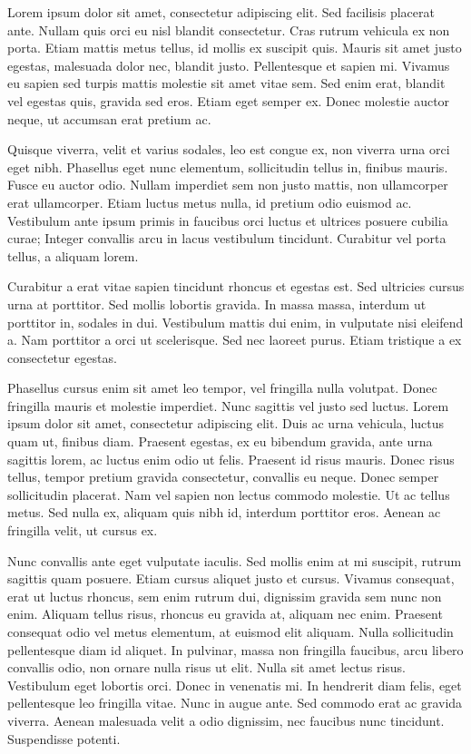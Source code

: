 \documentclass{article}
\begin{document}
Lorem ipsum dolor sit amet, consectetur adipiscing elit. Sed facilisis placerat ante. Nullam quis orci eu nisl blandit consectetur. Cras rutrum vehicula ex non porta. Etiam mattis metus tellus, id mollis ex suscipit quis. Mauris sit amet justo egestas, malesuada dolor nec, blandit justo. Pellentesque et sapien mi. Vivamus eu sapien sed turpis mattis molestie sit amet vitae sem. Sed enim erat, blandit vel egestas quis, gravida sed eros. Etiam eget semper ex. Donec molestie auctor neque, ut accumsan erat pretium ac.

Quisque viverra, velit et varius sodales, leo est congue ex, non viverra urna orci eget nibh. Phasellus eget nunc elementum, sollicitudin tellus in, finibus mauris. Fusce eu auctor odio. Nullam imperdiet sem non justo mattis, non ullamcorper erat ullamcorper. Etiam luctus metus nulla, id pretium odio euismod ac. Vestibulum ante ipsum primis in faucibus orci luctus et ultrices posuere cubilia curae; Integer convallis arcu in lacus vestibulum tincidunt. Curabitur vel porta tellus, a aliquam lorem.

Curabitur a erat vitae sapien tincidunt rhoncus et egestas est. Sed ultricies cursus urna at porttitor. Sed mollis lobortis gravida. In massa massa, interdum ut porttitor in, sodales in dui. Vestibulum mattis dui enim, in vulputate nisi eleifend a. Nam porttitor a orci ut scelerisque. Sed nec laoreet purus. Etiam tristique a ex consectetur egestas.

Phasellus cursus enim sit amet leo tempor, vel fringilla nulla volutpat. Donec fringilla mauris et molestie imperdiet. Nunc sagittis vel justo sed luctus. Lorem ipsum dolor sit amet, consectetur adipiscing elit. Duis ac urna vehicula, luctus quam ut, finibus diam. Praesent egestas, ex eu bibendum gravida, ante urna sagittis lorem, ac luctus enim odio ut felis. Praesent id risus mauris. Donec risus tellus, tempor pretium gravida consectetur, convallis eu neque. Donec semper sollicitudin placerat. Nam vel sapien non lectus commodo molestie. Ut ac tellus metus. Sed nulla ex, aliquam quis nibh id, interdum porttitor eros. Aenean ac fringilla velit, ut cursus ex.

Nunc convallis ante eget vulputate iaculis. Sed mollis enim at mi suscipit, rutrum sagittis quam posuere. Etiam cursus aliquet justo et cursus. Vivamus consequat, erat ut luctus rhoncus, sem enim rutrum dui, dignissim gravida sem nunc non enim. Aliquam tellus risus, rhoncus eu gravida at, aliquam nec enim. Praesent consequat odio vel metus elementum, at euismod elit aliquam. Nulla sollicitudin pellentesque diam id aliquet. In pulvinar, massa non fringilla faucibus, arcu libero convallis odio, non ornare nulla risus ut elit. Nulla sit amet lectus risus. Vestibulum eget lobortis orci. Donec in venenatis mi. In hendrerit diam felis, eget pellentesque leo fringilla vitae. Nunc in augue ante. Sed commodo erat ac gravida viverra. Aenean malesuada velit a odio dignissim, nec faucibus nunc tincidunt. Suspendisse potenti.
\end{document}
